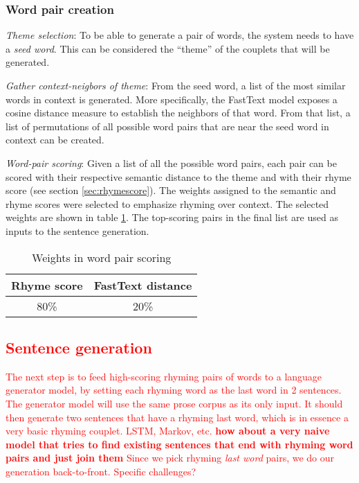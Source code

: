 \documentclass[11pt,a4paper]{article}
\newenvironment{tight_enumerate}{
\begin{enumerate}
\setlength{\itemsep}{0pt}
\setlength{\parskip}{0pt}
}{\end{enumerate}}
\begin{document}
\subsubsection{Word pair creation}
\begin{tight_enumerate}
	\item \textit{Theme selection}: To be able to generate a pair of words, the system needs to have a \textit{seed word}. This can be considered the ``theme'' of the couplets that will be generated.
	\item \textit{Gather context-neigbors of theme}: From the seed word, a list of the most similar words in context is generated. More specifically, the FastText model exposes a cosine distance measure to establish the neighbors of that word. From that list, a list of permutations of all possible word pairs that are near the seed word in context can be created.
	\item \textit{Word-pair scoring}: Given a list of all the possible word pairs, each pair can be scored with their respective semantic distance to the theme and with their rhyme score (see section \ref{sec:rhymescore}). The weights assigned to the semantic and rhyme scores were selected to emphasize rhyming over context. The selected weights are shown in table \ref{table:weight_wordpair}. The top-scoring pairs in the final list are used as inputs to the sentence generation.
\begin{table}[ht]
\centering
\begin{tabular}{c c}
	\hline\hline
	Rhyme score & FastText distance\\ [0.5ex]
	\hline
	80\% & 20\% \\ [0.5ex]
	\hline
\end{tabular}
\caption{Weights in word pair scoring}
\label{table:weight_wordpair}
\end{table}
\end{tight_enumerate}

\textcolor{red}{
\subsection{Sentence generation}
\label{sec:languagegen}
The next step is to feed high-scoring rhyming pairs of words to a language generator model, by setting each rhyming word as the last word in 2 sentences. The generator model will use the same prose corpus as its only input. It should then generate two sentences that have a rhyming last word, which is in essence a very basic rhyming couplet.
LSTM, Markov, etc.
\textbf{how about a very naive model that tries to find existing sentences that end with rhyming word pairs and just join them}
Since we pick rhyming \textit{last word} pairs, we do our generation back-to-front. Specific challenges?
}
\end{document}
